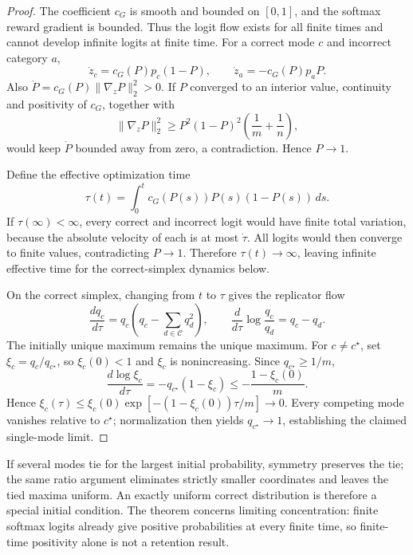\begin{proof}
\enforcehalffinalproseline
The coefficient $c_G$ is smooth and bounded on $[0,1]$, and the softmax
reward gradient is bounded. Thus the logit flow exists for all finite times
and cannot develop infinite logits at finite time.
For a correct mode $c$ and incorrect category $a$,
\[
  \dot z_c=c_G(P)p_c(1-P),
  \qquad
  \dot z_a=-c_G(P)p_aP.
\]
Also $\dot P=c_G(P)\lVert\nabla_zP\rVert_2^2>0$. If $P$ converged to an
interior value, continuity and positivity of $c_G$, together with
\[
 \lVert\nabla_zP\rVert_2^2
 \ge P^2(1-P)^2\left(\frac1m+\frac1n\right),
\]
would keep $\dot P$ bounded away from zero, a contradiction. Hence $P\to1$.

Define the effective optimization time
\[
  \tau(t)=\int_0^t c_G(P(s))P(s)(1-P(s))\,ds.
\]
If $\tau(\infty)<\infty$, every correct and incorrect logit would have finite
total variation, because the absolute velocity of each is at most $\dot\tau$.
All logits would then converge to finite values, contradicting $P\to1$.
Therefore $\tau(t)\to\infty$, leaving infinite effective time for the
correct-simplex dynamics below.

On the correct simplex, changing from $t$ to $\tau$ gives the replicator flow
\begin{equation}
  \frac{dq_c}{d\tau}
  =q_c\left(q_c-\sum_{d\in\mathcal C}q_d^2\right),
  \qquad
  \frac{d}{d\tau}\log\frac{q_c}{q_d}=q_c-q_d.
  \label{eq:grpo-replicator}
\end{equation}
The initially unique maximum remains the unique maximum. For $c\ne c^\star$,
set $\xi_c=q_c/q_{c^\star}$, so $\xi_c(0)<1$ and $\xi_c$ is nonincreasing.
Since $q_{c^\star}\ge1/m$,
\[
 \frac{d\log\xi_c}{d\tau}
 =-q_{c^\star}(1-\xi_c)
 \le-\frac{1-\xi_c(0)}{m}.
\]
Hence $\xi_c(\tau)\le\xi_c(0)\exp[-(1-\xi_c(0))\tau/m]\to0$.
Every competing mode vanishes relative to $c^\star$; normalization then
yields $q_{c^\star}\to1$, establishing the claimed single-mode limit.
\end{proof}

If several modes tie for the largest initial probability, symmetry preserves
the tie; the same ratio argument eliminates strictly smaller coordinates and
leaves the tied maxima uniform. An exactly uniform correct distribution is
therefore a special initial condition. The theorem concerns limiting
concentration: finite softmax logits already give positive probabilities at
every finite time, so finite-time positivity alone is not a retention result.

